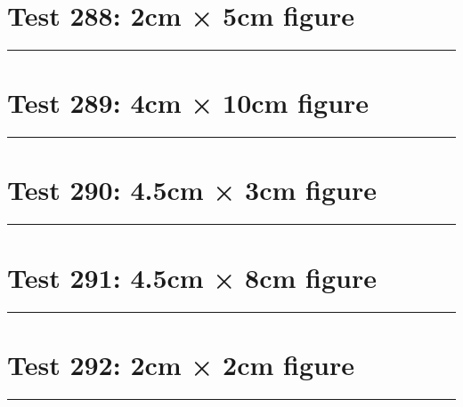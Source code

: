 \documentclass[a4paper,11pt]{article}
\begin{document}
\section*{Test 288: 2cm × 5cm figure}
\begin{swarmwrap}%
  \begin{minipage}[t]{2cm}
    \centering
    \rule{\linewidth}{5cm}
  \end{minipage}%
\end{swarmwrap}%
\swarmwrapnext
\lipsum[8]
\lipsum[9]
\lipsum[10]
\lipsum[11]
\lipsum[12]
\lipsum[13]
\section*{Test 289: 4cm × 10cm figure}
\begin{swarmwrap}%
  \begin{minipage}[t]{4cm}
    \centering
    \rule{\linewidth}{10cm}
  \end{minipage}%
\end{swarmwrap}%
\swarmwrapnext
\lipsum[58]
\lipsum[59]
\lipsum[60]
\lipsum[61]
\lipsum[62]
\section*{Test 290: 4.5cm × 3cm figure}
\begin{swarmwrap}%
  \begin{minipage}[t]{4cm}
    \centering
    \rule{\linewidth}{3cm}
  \end{minipage}%
\end{swarmwrap}%
\swarmwrapnext
\lipsum[79]
\lipsum[80]
\lipsum[81]
\lipsum[82]
\lipsum[83]
\lipsum[84]
\section*{Test 291: 4.5cm × 8cm figure}
\begin{swarmwrap}%
  \begin{minipage}[t]{4cm}
    \centering
    \rule{\linewidth}{8cm}
  \end{minipage}%
\end{swarmwrap}%
\swarmwrapnext
\lipsum[37]
\lipsum[38]
\lipsum[39]
\section*{Test 292: 2cm × 2cm figure}
\begin{swarmwrap}%
  \begin{minipage}[t]{2cm}
    \centering
    \rule{\linewidth}{2cm}
  \end{minipage}%
\end{swarmwrap}%
\swarmwrapnext
\lipsum[128]
\lipsum[129]
\lipsum[130]
\lipsum[131]
\lipsum[132]
\end{document}
